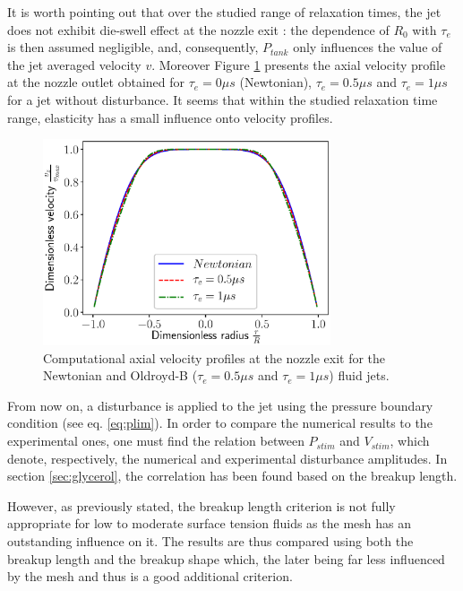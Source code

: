 \documentclass[twocolumn,10pt]{asme2ej}
\begin{document}
It is worth pointing out that over the studied range of relaxation times, the jet does not exhibit die-swell effect at the nozzle exit : the dependence of $R_0$ with $\tau_e$ is then assumed negligible, and, consequently, $P_{tank}$ only influences the value of the jet averaged velocity $v$. Moreover Figure \ref{fig:vProfiles} presents the axial velocity profile at the nozzle outlet obtained for $\tau_e = 0\mu s$ (Newtonian), $\tau_e = 0.5\mu s$ and $\tau_e = 1\mu s$ for a jet without disturbance. It seems that within the studied relaxation time range, elasticity has a small influence onto velocity profiles.

\begin{figure}[H]
    \centering
    \includegraphics[width=8.5cm]{rProfilesInk.eps}
    \caption{Computational axial velocity profiles at the nozzle exit for the Newtonian and Oldroyd-B ($\tau_e = 0.5\mu s$ and $\tau_e = 1\mu s$) fluid jets.}
    \label{fig:vProfiles}
\end{figure}

From now on, a disturbance is applied to the jet using the pressure boundary condition (see eq. \ref{eq:plim}). In order to compare the numerical results to the experimental ones, one must find the relation between $P_{stim}$ and $V_{stim}$, which denote, respectively, the numerical and experimental disturbance amplitudes. In section \ref{sec:glycerol}, the correlation has been found based on the breakup length. 

However, as previously stated, the breakup length criterion is not fully appropriate for low to moderate surface tension fluids as the mesh has an outstanding influence on it. The results are thus compared using both the breakup length and the breakup shape which, the later being far less influenced by the mesh and thus is a good additional criterion.
\end{document}
